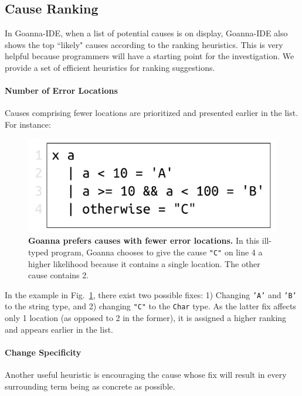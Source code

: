 \documentclass[pdflatex,lineno,sn-nature,Numbered]{sn-jnl}%
\begin{document}
    \subsection{Cause Ranking} \label{sub:ranking}
     In Goanna-IDE, when a list of potential causes is on display, Goanna-IDE also shows the top ``likely" causes according to the ranking heuristics. This is very helpful because programmers will have a starting point for the investigation. We provide a set of efficient heuristics for ranking suggestions. 

    \paragraph{Number of Error Locations}
    Causes comprising fewer locations are prioritized and presented earlier in the list. For instance:
   \begin{figure}[ht!]
        \centering
        \includegraphics[width=0.5\linewidth]{images/Loc-Count}
        \caption[Goanna prefers causes with fewer error locations]{\textbf{Goanna prefers causes with fewer error locations.} In this ill-typed program, Goanna chooses to give the cause \texttt{"C"} on line 4 a higher likelihood because it contains a single location. The other cause contains 2. }
        \label{fig:loc-count}
    \end{figure}

    In the example in Fig.~\ref{fig:loc-count}, there exist two possible fixes: 1) Changing \texttt{'A'} and \texttt{'B'} to the string type, and 2) changing \texttt{"C"} to the \texttt{Char} type. As the latter fix affects only 1 location (as opposed to 2 in the former), it is assigned a higher ranking and appears earlier in the list.

    \paragraph{Change Specificity}
	Another useful heuristic is encouraging the cause whose fix will result in every surrounding term being as concrete as possible.
	
\end{document}
